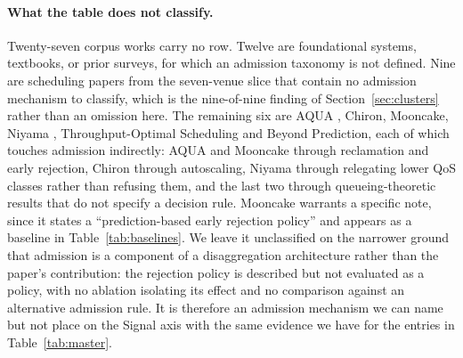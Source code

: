 \documentclass[10pt]{article} %
\theoremstyle{definition}
\begin{document}
\paragraph{What the table does not classify.} Twenty-seven corpus works
carry no row. Twelve are foundational systems, textbooks, or prior
surveys, for which an admission taxonomy is not defined. Nine are
scheduling papers from the seven-venue slice that contain no admission
mechanism to classify, which is the nine-of-nine finding of
Section~\ref{sec:clusters} rather than an omission here. The remaining
six are AQUA \citep{kumar2025aqua}, Chiron, Mooncake, Niyama
\citep{goel2025niyama}, Throughput-Optimal Scheduling and Beyond
Prediction, each of which touches admission indirectly:
AQUA and Mooncake through reclamation and early rejection, Chiron
through autoscaling, Niyama through relegating lower QoS classes rather
than refusing them, and the last two through queueing-theoretic results
that do not specify a decision rule. Mooncake warrants a specific
note, since it states a ``prediction-based early rejection policy'' and
appears as a baseline in Table~\ref{tab:baselines}. We leave it
unclassified on the narrower ground that admission is a component of a
disaggregation architecture rather than the paper's contribution: the
rejection policy is described but not evaluated as a policy, with no
ablation isolating its effect and no comparison against an alternative
admission rule. It is therefore an admission mechanism we can name but
not place on the Signal axis with the same evidence we have for the
entries in Table~\ref{tab:master}.
\end{document}
